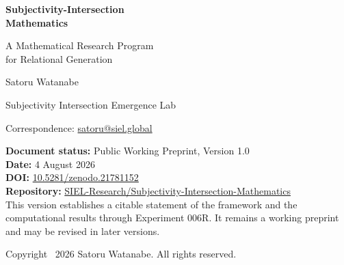 \documentclass[11pt,a4paper]{article}
\begin{document}
\begin{titlepage}
\thispagestyle{empty}
\vspace*{18mm}
{\sffamily\bfseries\color{SIELblue}\fontsize{25}{30}\selectfont
\mbox{Subjectivity-Intersection}\\Mathematics\par}
\vspace{7mm}
{\sffamily\fontsize{18}{23}\selectfont
A Mathematical Research Program\\for Relational Generation\par}

\vspace{18mm}
{\large Satoru Watanabe\par}
\vspace{2mm}
{\normalsize Subjectivity Intersection Emergence Lab\par}
{\normalsize Correspondence: \href{mailto:satoru@siel.global}{satoru@siel.global}\par}

\vfill
\noindent\colorbox{SIELlight}{%
  \parbox{0.93\textwidth}{%
  \vspace{2mm}
  \textbf{Document status:} Public Working Preprint, Version 1.0\\
  \textbf{Date:} 4 August 2026\\
  \textbf{DOI:} \href{https://doi.org/10.5281/zenodo.21781152}{10.5281/zenodo.21781152}\\
  \textbf{Repository:} \href{https://github.com/SIEL-Research/Subjectivity-Intersection-Mathematics}{SIEL-Research/Subjectivity-Intersection-Mathematics}\\
  This version establishes a citable statement of the framework and the computational results through Experiment 006R. It remains a working preprint and may be revised in later versions.
  \vspace{2mm}
  }}

\vspace{10mm}
{\small Copyright \textcopyright\ 2026 Satoru Watanabe. All rights reserved.\par}
\end{titlepage}
\end{document}
